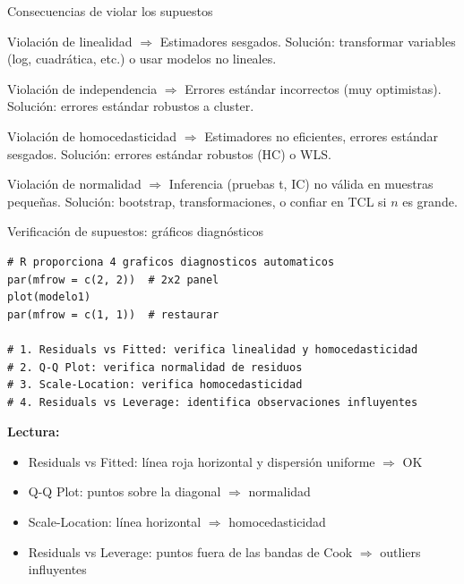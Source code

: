 \documentclass[aspectratio=169, 11pt]{beamer}
\begin{document}
\begin{frame}{Consecuencias de violar los supuestos}
\begin{alertblock}{Violación de linealidad}
$\Rightarrow$ Estimadores sesgados. Solución: transformar variables (log, cuadrática, etc.) o usar modelos no lineales.
\end{alertblock}

\begin{alertblock}{Violación de independencia}
$\Rightarrow$ Errores estándar incorrectos (muy optimistas). Solución: errores estándar robustos a cluster.
\end{alertblock}

\begin{alertblock}{Violación de homocedasticidad}
$\Rightarrow$ Estimadores no eficientes, errores estándar sesgados. Solución: errores estándar robustos (HC) o WLS.
\end{alertblock}

\begin{alertblock}{Violación de normalidad}
\small $\Rightarrow$ Inferencia (pruebas t, IC) no válida en muestras pequeñas. Solución: bootstrap, transformaciones, o confiar en TCL si $n$ es grande.
\end{alertblock}
\end{frame}

\begin{frame}[fragile]{Verificación de supuestos: gráficos diagnósticos}
\begin{lstlisting}
# R proporciona 4 graficos diagnosticos automaticos
par(mfrow = c(2, 2))  # 2x2 panel
plot(modelo1)
par(mfrow = c(1, 1))  # restaurar

# 1. Residuals vs Fitted: verifica linealidad y homocedasticidad
# 2. Q-Q Plot: verifica normalidad de residuos
# 3. Scale-Location: verifica homocedasticidad
# 4. Residuals vs Leverage: identifica observaciones influyentes
\end{lstlisting}

\vspace{0.2cm}
\textbf{Lectura:}
\begin{itemize}
  \item Residuals vs Fitted: línea roja horizontal y dispersión uniforme $\Rightarrow$ OK
  \item Q-Q Plot: puntos sobre la diagonal $\Rightarrow$ normalidad
  \item Scale-Location: línea horizontal $\Rightarrow$ homocedasticidad
  \item Residuals vs Leverage: puntos fuera de las bandas de Cook $\Rightarrow$ outliers influyentes
\end{itemize}
\end{frame}
\end{document}
